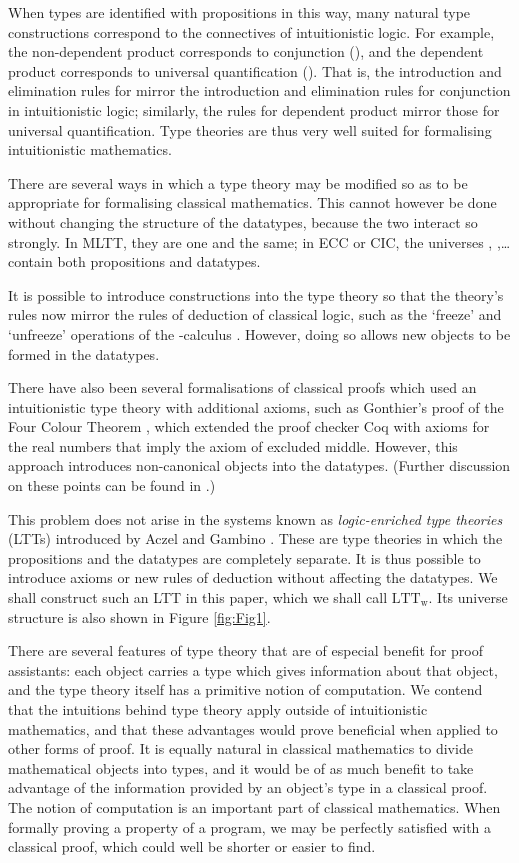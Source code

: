 \documentclass[acmtocl]{acmtrans2m}
\newcommand{\LTTW}{\ensuremath{\mathrm{LTT}_\mathrm{w}}}
\begin{document}
When types are identified with propositions in this way, many natural type constructions correspond to the connectives of intuitionistic logic.  For example, the non-dependent product  corresponds to conjunction (), and the dependent product  corresponds to universal quantification ().  That is, the introduction and elimination rules for  mirror the introduction and elimination rules for conjunction in intuitionistic logic; similarly, the rules for dependent product mirror those for universal quantification.
Type theories are thus very well suited for formalising intuitionistic mathematics.

There are several ways in which a type theory may be modified so as to be appropriate for formalising classical mathematics. This cannot however be done without changing the structure of the datatypes, because the two interact so strongly.  In MLTT, they are one and the same; in ECC or CIC, the universes , ,\nolinebreak \ldots contain both propositions and datatypes.

It is possible to introduce constructions
into the type theory so that the theory's rules now mirror the rules of deduction of classical logic, such as the `freeze' and `unfreeze' operations of the -calculus \cite{lambdamu}.  However, doing so allows new objects to be formed in the datatypes.

There have also been several formalisations of classical proofs which used an intuitionistic type theory with additional axioms,
such as Gonthier's proof of the Four Colour Theorem
\cite{gonthier:fct}, which extended the proof checker Coq with axioms for the real numbers that imply the axiom of excluded middle.  However, this approach introduces non-canonical objects into the datatypes.
(Further discussion on these points can be found in \cite{luo:LTT06}.)





This problem does not arise in the systems known as \emph{logic-enriched type theories} (LTTs) introduced by Aczel and Gambino \cite{ag:cpdtt,ga:gticst}.  These are type theories in which the propositions and the datatypes are completely separate.  It is thus possible to introduce axioms or new rules of deduction without affecting the datatypes.  We shall construct such an LTT in this paper, which we shall call \LTTW.  Its universe structure is also shown in Figure \ref{fig:Fig1}.

There are several features of type theory that are of especial benefit for proof assistants: each object carries
a type which gives information about that object, and the type theory itself has a primitive notion of computation.
We contend that the intuitions behind type theory apply outside of
intuitionistic mathematics, and that these advantages
would prove beneficial when applied to other forms of proof.  It is
equally natural in classical mathematics to divide mathematical
objects into types, and it would be of as much benefit to take
advantage of the information provided by an object's type in a
classical proof.  The notion of computation is an important part of
classical mathematics.  When formally proving a property of a
program, we may be perfectly satisfied with a classical proof, which
could well be shorter or easier to find.
\end{document}
